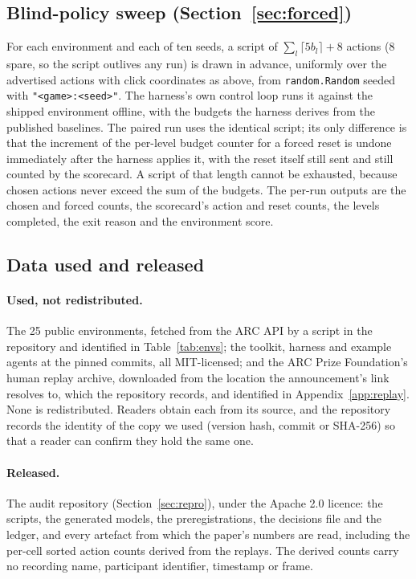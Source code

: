 \documentclass[11pt]{article}
\newcommand{\code}[1]{\texttt{#1}}
\begin{document}
\subsection{Blind-policy sweep (Section~\ref{sec:forced})}

For each environment and each of ten seeds, a script of $\sum_l \lceil 5 b_l
\rceil + 8$ actions (8 spare, so the script outlives any run) is drawn in advance, uniformly over the advertised actions
with click coordinates as above, from \code{random.Random} seeded with
\code{"<game>:<seed>"}. The harness's own control loop runs it against the
shipped environment offline, with the budgets the harness derives from the
published baselines. The paired run uses the identical script; its only
difference is that the increment of the per-level budget counter for a forced
reset is undone immediately after the harness applies it, with the reset itself
still sent and still counted by the scorecard. A script of that length cannot
be exhausted, because chosen actions never exceed the sum of the budgets. The
per-run outputs are the chosen and forced counts, the scorecard's action and
reset counts, the levels completed, the exit reason and the environment score.

\subsection{Data used and released}
\label{app:data}

\paragraph{Used, not redistributed.} The 25 public environments, fetched from
the ARC API by a script in the repository and identified in
Table~\ref{tab:envs}; the toolkit, harness and example agents at the pinned
commits, all MIT-licensed; and the ARC Prize Foundation's human replay archive,
downloaded from the location the announcement's link resolves to, which the
repository records, and identified in Appendix~\ref{app:replay}. None is redistributed. Readers obtain each from its
source, and the repository records the identity of the copy we used (version
hash, commit or SHA-256) so that a reader can confirm they hold the same one.

\paragraph{Released.} The audit repository (Section~\ref{sec:repro}), under the
Apache 2.0 licence: the scripts, the generated models, the preregistrations,
the decisions file and the ledger, and every artefact from which the paper's
numbers are read, including the per-cell sorted action counts derived from the
replays. The derived counts carry no recording name, participant identifier,
timestamp or frame.
\end{document}
